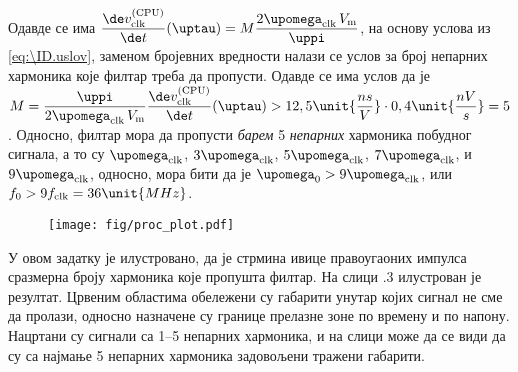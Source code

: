     
    Одавде се има 
    $\dfrac{\de v_{\rm clk}^{\rm (CPU)}}{\de t} (\uptau)
    = 
    M
    \dfrac{ 2
        \upomega_{\rm clk} \, 
        V_{\rm m} }{\uppi} 
    $, на основу услова из \eqref{eq:\ID.uslov}, заменом бројевних вредности налази се услов 
    за број непарних хармоника које филтар треба да пропусти. Одавде се има услов да је 
    $M = 
    \dfrac{\uppi} { 2
        \upomega_{\rm clk} \, 
        V_{\rm m} } 
    \dfrac{\de v_{\rm clk}^{\rm (CPU)}}{\de t} (\uptau)
    > 12,5 \unit{\dfrac{ns}{V}} \cdot 0,4 \unit{\dfrac{nV}{s}} = 5$. Односно, филтар мора да пропусти
    \textit{барем} 5 \textit{непарних} хармоника побудног сигнала, а то су
    $\upomega_{\rm clk}$, $3\upomega_{\rm clk}$, $5\upomega_{\rm clk}$, $7\upomega_{\rm clk}$, и
    $9\upomega_{\rm clk}$, односно, мора бити да је 
    $\upomega_0 > 9\upomega_{\rm clk}$, или 
    $f_0 > 9f_{\rm clk} = 36\unit{MHz}$.    
 
    \begin{figure}[ht!]
        \centering
        \texttt{[image: fig/proc\_plot.pdf]} 
        \caption{}
    \end{figure}
    
    У овом задатку је илустровано, да је стрмина ивице правоугаоних импулса сразмерна
    броју хармоника које пропушта филтар. На слици \ID.3 илустрован је резултат. 
    Црвеним областима обележени су габарити унутар којих сигнал не сме да пролази, 
    односно назначене су границе прелазне зоне по времену и по напону. Нацртани су сигнали 
    са 1--5 непарних хармоника, и на слици може да се види да су са најмање 5
    непарних хармоника задовољени
    тражени габарити. 

  
